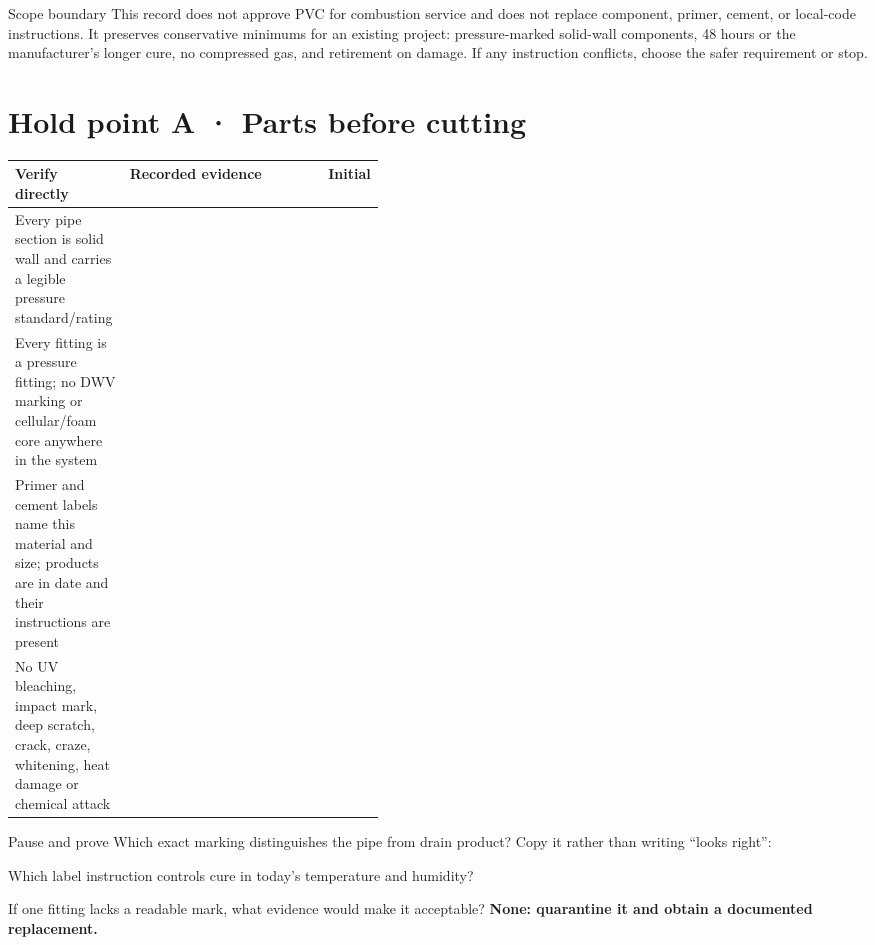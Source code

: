 


\telosmasthead[\editiontag]
\adultonly

\begin{teloshazard}{Scope boundary}
This record does not approve PVC for combustion service and does not replace
component, primer, cement, or local-code instructions. It preserves conservative
minimums for an existing project: pressure-marked solid-wall components,
48 hours or the manufacturer's longer cure, no compressed gas, and retirement
on damage. If any instruction conflicts, choose the safer requirement or stop.
\end{teloshazard}

\section{Hold point A · Parts before cutting}
\begin{tabularx}{\linewidth}{@{}p{0.31\linewidth}L p{0.12\linewidth}@{}}
\toprule \textbf{Verify directly} & \textbf{Recorded evidence} & \textbf{Initial}\\
\midrule
Every pipe section is solid wall and carries a legible pressure standard/rating
& &\\[1.05em]
Every fitting is a pressure fitting; no DWV marking or cellular/foam core
anywhere in the system & &\\[1.05em]
Primer and cement labels name this material and size; products are in date and
their instructions are present & &\\[1.05em]
No UV bleaching, impact mark, deep scratch, crack, craze, whitening, heat damage
or chemical attack & &\\
\bottomrule
\end{tabularx}

\begin{teloscard}{Pause and prove}
Which exact marking distinguishes the pipe from drain product? Copy it rather
than writing ``looks right'': \hrulefill

Which label instruction controls cure in today's temperature and humidity?
\hrulefill

If one fitting lacks a readable mark, what evidence would make it acceptable?
\textbf{None: quarantine it and obtain a documented replacement.}
\end{teloscard}

